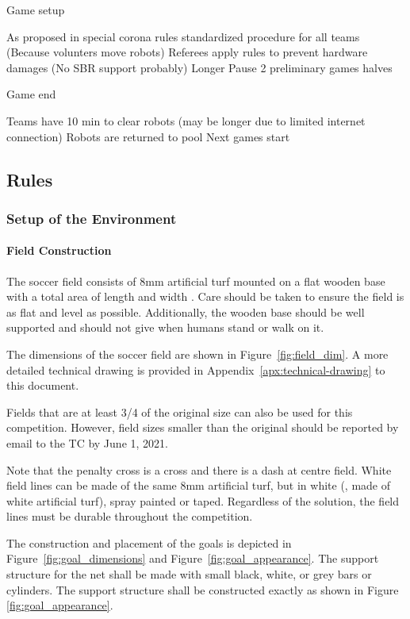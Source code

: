 Game setup

    As proposed in special corona rules
    standardized procedure for all teams (Because volunters move robots)
    Referees apply rules to prevent hardware damages (No SBR support probably)
    Longer Pause
    2 preliminary games halves

Game end

    Teams have 10 min to clear robots (may be longer due to limited internet connection)
    Robots are returned to pool
    Next games start



\subsection{Rules}

\subsubsection{Setup of the Environment}
\paragraph{Field Construction}
\label{sec:field_dim}

The soccer field consists of 8mm artificial turf mounted on a flat wooden base with a total area of length \TotalLength and width \TotalWidth.  Care should be taken to ensure the field is as flat and level as possible.  Additionally, the wooden base should be well supported and should not give when humans stand or walk on it.

The dimensions of the soccer field are shown in Figure~\ref{fig:field_dim}.
A more detailed technical drawing is provided in Appendix~\ref{apx:technical-drawing} to this document.

Fields that are at least 3/4 of the original size can also be used for this competition. However, field sizes smaller than the original should be reported by email to the TC by June 1, 2021.
 
Note that the penalty cross is a cross and there is a dash at centre field. White field lines can be made of the same 8mm artificial turf, but in white (\ie, made of white artificial turf), spray painted or taped. Regardless of the solution, the field lines must be durable throughout the competition.

The construction and placement of the goals is depicted in Figure~\ref{fig:goal_dimensions} and Figure~\ref{fig:goal_appearance}. The support structure for the net shall be made with small black, white, or grey bars or cylinders. The support structure shall be constructed exactly as shown in Figure \ref{fig:goal_appearance}.


